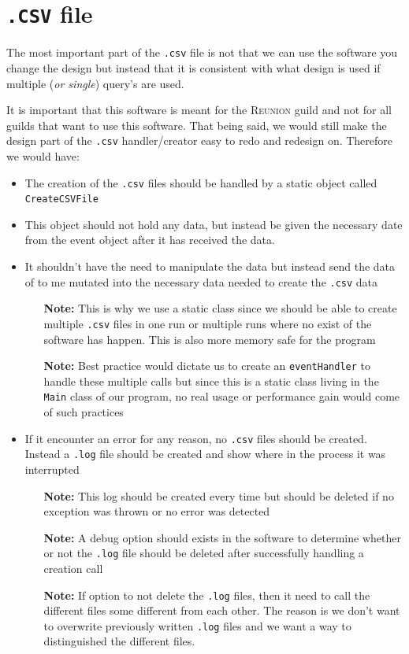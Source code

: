\documentclass[10pt, a4paper]{memoir}
\numberwithin{equation}{section}
\theoremstyle{plain}
\theoremstyle{defp}
\theoremstyle{dotless}
\theoremstyle{definition}
\theoremstyle{dotless}
\theoremstyle{dotless}
\theoremstyle{defp}
\theoremstyle{defp}
\theoremstyle{be}          %
\theoremstyle{defp}
\newcommand\ttt[1]{\texttt{#1}}
\newcommand\tsc[1]{\textsc{#1}}
\begin{document}
\section{\ttt{.CSV} file}

The most important part of the \ttt{.csv} file is not that we can use the software you change the design but instead that it is consistent with what design is used if multiple (\textit{or single}) query's are used.

\medskip

It is important that this software is meant for the \tsc{Reunion} guild and not for all guilds that want to use this software. That being said, we would still make the design part of the \ttt{.csv} handler/creator easy to redo and redesign on. Therefore we would have:

\begin{itemize}[noitemsep,topsep=1pt]
\item The creation of the \ttt{.csv} files should be handled by a static object called \ttt{CreateCSVFile}
\item This object should not hold any data, but instead be given the necessary date from the event object after it has received the data.
\item It shouldn't have the need to manipulate the data but instead send the data of to me mutated into the necessary data needed to create the \ttt{.csv} data
	\begin{itemize}[noitemsep,topsep=1pt]
	\item[\textbf{Note: }] This is why we use a static class since we should be able to create multiple \ttt{.csv} files in one run or multiple runs where no exist of the software has happen. This is also more memory safe for the program
	\item[\textbf{Note: }] Best practice would dictate us to create an \ttt{eventHandler} to handle these multiple calls but since this is a static class living in the \ttt{Main} class of our program, no real usage or performance gain would come of such practices
	\end{itemize}
\item If it encounter an error for any reason, no \ttt{.csv} files should be created. Instead a \ttt{.log} file should be created and show where in the process it was interrupted
	\begin{itemize}[noitemsep,topsep=1pt]
	\item[\textbf{Note: }] This log should be created every time but should be deleted if no exception was thrown or no error was detected
	\item[\textbf{Note: }] A debug option should exists in the software to determine whether or not the \ttt{.log} file should be deleted after successfully handling a creation call
	\item[\textbf{Note: }] If option to not delete the \ttt{.log} files, then it need to call the different files some different from each other. The reason is we don't want to overwrite previously written \ttt{.log} files and we want a way to distinguished the different files. 
	\end{itemize}
\end{itemize}
\end{document}
